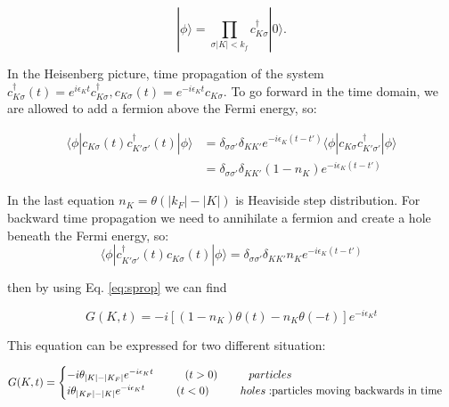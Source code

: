 \begin{equation}
    |\phi\rangle=\prod_{\sigma|K|<k_f}c_{K\sigma}^\dagger|0\rangle.
\end{equation}

\noindent In the Heisenberg picture, time propagation of the system $c_{K\sigma}^\dagger(t)=e^{i\epsilon_K t}c_{K\sigma}^\dagger , c_{K\sigma}(t)=e^{-i\epsilon_K t}c_{K\sigma}$. To go forward in the time domain, we are allowed to add a fermion above the Fermi energy, so:

\begin{equation}
\begin{split}
    \langle\phi|c_{K\sigma}(t)c_{K'\sigma'}^\dagger(t)|\phi\rangle&=\delta_{\sigma\sigma'}\delta_{KK'}e^{-i\epsilon_K(t-t')}\langle\phi|c_{K\sigma}c_{K'\sigma'}^\dagger|\phi\rangle\\
    &=\delta_{\sigma\sigma'}\delta_{KK'}(1-n_K)e^{-i\epsilon_K(t-t')}
    \end{split}
\end{equation}

\noindent In the last equation $n_K=\theta(|k_F|-|K|)$ is Heaviside step distribution. For backward time propagation we need to annihilate a fermion and create a hole beneath the Fermi energy, so:
\begin{equation}
    \langle\phi|c_{K'\sigma'}^\dagger(t)c_{K\sigma}(t)|\phi\rangle=\delta_{\sigma\sigma'}\delta_{KK'}n_Ke^{-i\epsilon_K(t-t')}
\end{equation}

\noindent then by using Eq. \ref{eq:sprop} we can find

\begin{equation}
    G(K,t)=-i[(1-n_K)\theta(t)-n_K\theta(-t)]e^{-i\epsilon_Kt}
\end{equation}

\noindent This equation can be expressed for two different situation:

\begin{equation}
    G(K,t)=\begin{cases}
    -i\theta_{|K|-|K_F|}e^{-i\epsilon_Kt}\hspace{1cm} (t>0)\hspace{1cm} particles\\
    i\theta_{|K_F|-|K|}e^{-i\epsilon_Kt}\hspace{1cm} (t<0)\hspace{1cm}holes: $particles moving backwards in time$
    \end{cases}
\end{equation}


